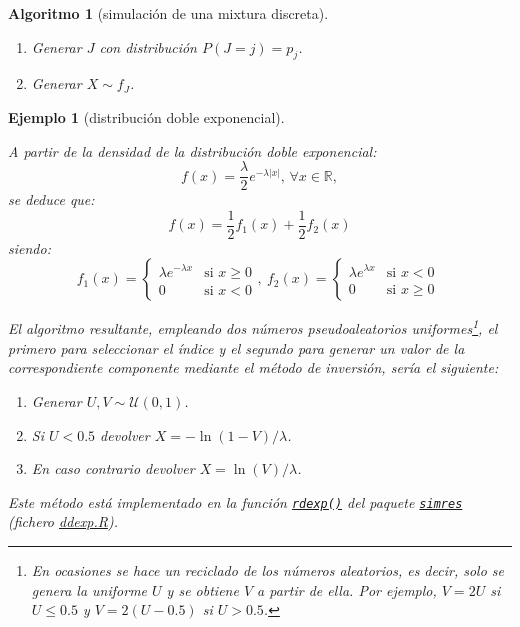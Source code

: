 \documentclass[
]{book}
\theoremstyle{break}
\newtheorem{conjecture}{Algoritmo}[chapter]
\newtheorem{example}{Ejemplo}[chapter]
\theoremstyle{nonumberplain}
\begin{document}
\begin{conjecture}[simulación de una mixtura discreta]
\protect\hypertarget{cnj:mixtura-discreta}{}\label{cnj:mixtura-discreta}

\begin{enumerate}
\def\labelenumi{\arabic{enumi}.}
\item
  Generar \(J\) con distribución \(P\left( J=j \right) = p_j\).
\item
  Generar \(X\sim f_J\).
\end{enumerate}

\end{conjecture}

\begin{example}[distribución doble exponencial]
\protect\hypertarget{exm:dexp-mix}{}\label{exm:dexp-mix}

A partir de la densidad de la distribución doble exponencial:
\[f(x) =\frac{\lambda }{2}e^{-\lambda \left\vert x\right\vert } \text{, }\forall x\in \mathbb{R},\]
se deduce que:
\[f(x) = \frac{1}{2}f_{1}(x) + \frac{1}{2}f_{2}(x)\]
siendo:
\[f_{1}(x) = \left\{ 
\begin{array}{ll}
\lambda e^{-\lambda x} & \text{si } x\geq 0 \\ 
0 & \text{si } x<0
\end{array}
\right., \  
f_{2}(x) = \left\{ 
\begin{array}{ll}
\lambda e^{\lambda x} & \text{si } x<0 \\ 
0 & \text{si } x\geq 0
\end{array}
\ \right.\]

El algoritmo resultante, empleando dos números pseudoaleatorios uniformes\footnote{En ocasiones se hace un reciclado de los números aleatorios, es decir, solo se genera la uniforme \(U\) y se obtiene \(V\) a partir de ella. Por ejemplo, \(V=2U\) si \(U \le 0.5\) y \(V=2(U-0.5)\) si \(U > 0.5\).}, el primero para seleccionar el índice y el segundo para generar un valor de la correspondiente componente mediante el método de inversión, sería el siguiente:

\begin{enumerate}
\def\labelenumi{\arabic{enumi}.}
\item
  Generar \(U,V \sim \mathcal{U}(0, 1)\).
\item
  Si \(U<0.5\) devolver \(X= -\ln( 1-V )/\lambda\).
\item
  En caso contrario devolver \(X= \ln(V)/\lambda\).
\end{enumerate}

Este método está implementado en la función \href{https://rubenfcasal.github.io/simres/reference/ddexp.html}{\texttt{rdexp()}} del paquete \href{https://rubenfcasal.github.io/simres}{\texttt{simres}} (fichero \href{R/ddexp.R}{\emph{ddexp.R}}).
\end{example}
\end{document}
